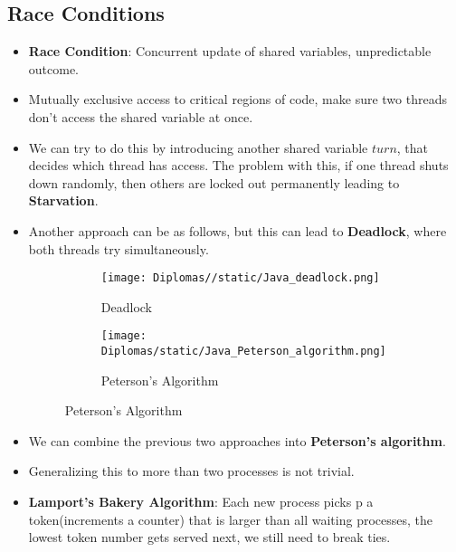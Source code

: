 \documentclass[a4paper]{article}
\begin{document}
\subsection{Race Conditions}
\begin{itemize}
    \item \textbf{Race Condition}: Concurrent update of shared variables, unpredictable outcome.
    \item Mutually exclusive access to critical regions of code, make sure two threads don't access the shared variable at once.
    \item We can try to do this by introducing another shared variable $turn$, that decides which thread has access. The problem with this, if one thread shuts down randomly, then others are locked out permanently leading to \textbf{Starvation}.
    \item Another approach can be as follows, but this can lead to \textbf{Deadlock}, where both threads try simultaneously.
    \begin{figure}[H]
        \centering
        \begin{subfigure}[b]{0.45\textwidth}
            \centering
            \texttt{[image: Diplomas//static/Java\_deadlock.png]}
            \caption{Deadlock}
            \label{fig:Java-deadlock}    
        \end{subfigure}
        \hfill
        \begin{subfigure}[b]{0.45\textwidth}
            \centering
            \texttt{[image: Diplomas/static/Java\_Peterson\_algorithm.png]}
            \caption{Peterson's Algorithm}
            \label{fig:Java-peterson-alg}
        \end{subfigure}
    \end{figure}
    \item We can combine the previous two approaches into \textbf{Peterson's algorithm}.
    \item Generalizing this to more than two processes is not trivial.
    \item \textbf{Lamport's Bakery Algorithm}: Each new process picks p a token(increments a counter) that is larger than all waiting processes, the lowest token number gets served next, we still need to break ties.
\end{itemize}
\end{document}
